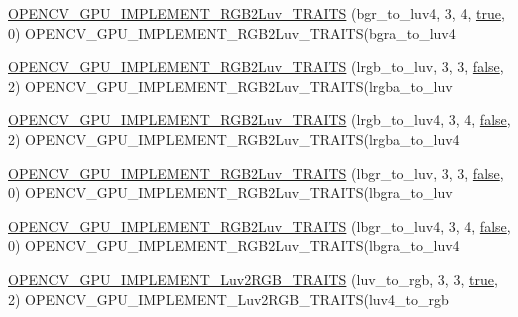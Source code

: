 \begin{DoxyCompactItemize}
\item 
\hyperlink{namespacecv_1_1gpu_1_1device_a59229565627c8aba989fdf6ab9f3af57}{O\-P\-E\-N\-C\-V\-\_\-\-G\-P\-U\-\_\-\-I\-M\-P\-L\-E\-M\-E\-N\-T\-\_\-\-R\-G\-B2\-Luv\-\_\-\-T\-R\-A\-I\-T\-S} (bgr\-\_\-to\-\_\-luv4, 3, 4, \hyperlink{namespacecv_1_1gpu_1_1device_ac34c172a7a1904fb0fd477321a31f926}{true}, 0) O\-P\-E\-N\-C\-V\-\_\-\-G\-P\-U\-\_\-\-I\-M\-P\-L\-E\-M\-E\-N\-T\-\_\-\-R\-G\-B2\-Luv\-\_\-\-T\-R\-A\-I\-T\-S(bgra\-\_\-to\-\_\-luv4
\item 
\hyperlink{namespacecv_1_1gpu_1_1device_a6edc152da864b5cf765a1c075e051706}{O\-P\-E\-N\-C\-V\-\_\-\-G\-P\-U\-\_\-\-I\-M\-P\-L\-E\-M\-E\-N\-T\-\_\-\-R\-G\-B2\-Luv\-\_\-\-T\-R\-A\-I\-T\-S} (lrgb\-\_\-to\-\_\-luv, 3, 3, \hyperlink{namespacecv_1_1gpu_1_1device_af8d6418be1712e83b4f398e7e7273026}{false}, 2) O\-P\-E\-N\-C\-V\-\_\-\-G\-P\-U\-\_\-\-I\-M\-P\-L\-E\-M\-E\-N\-T\-\_\-\-R\-G\-B2\-Luv\-\_\-\-T\-R\-A\-I\-T\-S(lrgba\-\_\-to\-\_\-luv
\item 
\hyperlink{namespacecv_1_1gpu_1_1device_ab0a9ca5e6fff79788693588c493ae152}{O\-P\-E\-N\-C\-V\-\_\-\-G\-P\-U\-\_\-\-I\-M\-P\-L\-E\-M\-E\-N\-T\-\_\-\-R\-G\-B2\-Luv\-\_\-\-T\-R\-A\-I\-T\-S} (lrgb\-\_\-to\-\_\-luv4, 3, 4, \hyperlink{namespacecv_1_1gpu_1_1device_af8d6418be1712e83b4f398e7e7273026}{false}, 2) O\-P\-E\-N\-C\-V\-\_\-\-G\-P\-U\-\_\-\-I\-M\-P\-L\-E\-M\-E\-N\-T\-\_\-\-R\-G\-B2\-Luv\-\_\-\-T\-R\-A\-I\-T\-S(lrgba\-\_\-to\-\_\-luv4
\item 
\hyperlink{namespacecv_1_1gpu_1_1device_adef98899c5043c0287b9d861495c3e9f}{O\-P\-E\-N\-C\-V\-\_\-\-G\-P\-U\-\_\-\-I\-M\-P\-L\-E\-M\-E\-N\-T\-\_\-\-R\-G\-B2\-Luv\-\_\-\-T\-R\-A\-I\-T\-S} (lbgr\-\_\-to\-\_\-luv, 3, 3, \hyperlink{namespacecv_1_1gpu_1_1device_af8d6418be1712e83b4f398e7e7273026}{false}, 0) O\-P\-E\-N\-C\-V\-\_\-\-G\-P\-U\-\_\-\-I\-M\-P\-L\-E\-M\-E\-N\-T\-\_\-\-R\-G\-B2\-Luv\-\_\-\-T\-R\-A\-I\-T\-S(lbgra\-\_\-to\-\_\-luv
\item 
\hyperlink{namespacecv_1_1gpu_1_1device_afe909f2b2e046a13460ac57f160acd6f}{O\-P\-E\-N\-C\-V\-\_\-\-G\-P\-U\-\_\-\-I\-M\-P\-L\-E\-M\-E\-N\-T\-\_\-\-R\-G\-B2\-Luv\-\_\-\-T\-R\-A\-I\-T\-S} (lbgr\-\_\-to\-\_\-luv4, 3, 4, \hyperlink{namespacecv_1_1gpu_1_1device_af8d6418be1712e83b4f398e7e7273026}{false}, 0) O\-P\-E\-N\-C\-V\-\_\-\-G\-P\-U\-\_\-\-I\-M\-P\-L\-E\-M\-E\-N\-T\-\_\-\-R\-G\-B2\-Luv\-\_\-\-T\-R\-A\-I\-T\-S(lbgra\-\_\-to\-\_\-luv4
\item 
\hyperlink{namespacecv_1_1gpu_1_1device_a568a440a36cfa39a052ab55c74a1c3b8}{O\-P\-E\-N\-C\-V\-\_\-\-G\-P\-U\-\_\-\-I\-M\-P\-L\-E\-M\-E\-N\-T\-\_\-\-Luv2\-R\-G\-B\-\_\-\-T\-R\-A\-I\-T\-S} (luv\-\_\-to\-\_\-rgb, 3, 3, \hyperlink{namespacecv_1_1gpu_1_1device_ac34c172a7a1904fb0fd477321a31f926}{true}, 2) O\-P\-E\-N\-C\-V\-\_\-\-G\-P\-U\-\_\-\-I\-M\-P\-L\-E\-M\-E\-N\-T\-\_\-\-Luv2\-R\-G\-B\-\_\-\-T\-R\-A\-I\-T\-S(luv4\-\_\-to\-\_\-rgb

\end{DoxyCompactItemize}

